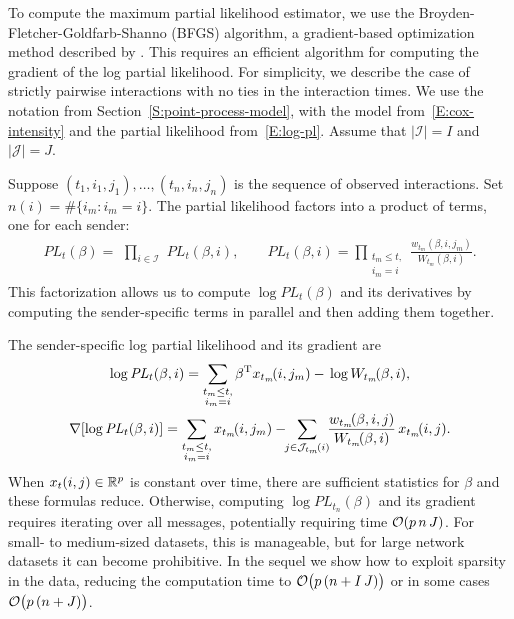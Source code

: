 \documentclass[final]{statsoc}
\begin{document}
To compute the maximum partial likelihood estimator, we use the
Broyden-Fletcher-Goldfarb-Shanno (BFGS) algorithm, a gradient-based
optimization method described by
\citet{nocedal2006numerical}.  This requires an efficient algorithm for
computing the gradient of the log partial likelihood.  For simplicity, we
describe the case of strictly pairwise interactions with no ties in the
interaction times.  We use the notation from
Section~\ref{S:point-process-model}, with
the model from~\eqref{E:cox-intensity} and the partial likelihood 
from~\eqref{E:log-pl}.
Assume that $|\mathcal{I}| = I$ and $|\mathcal{J}| = J$.

Suppose $(t_1, i_1, j_1), \ldots, (t_n, i_n, j_n)$ is the sequence of observed
interactions.  Set $n(i) = \#\{ i_m : i_m = i \}.$
The partial likelihood factors into a product of terms, one for each sender:
\begin{align*}
    \mathit{PL}_t(\beta)
        =
        \,\,
        \prod_{i \in \mathcal{I}}
            \,\,
            \mathit{PL}_t(\beta, i),
    \qquad
    \mathit{PL}_t(\beta, i)
        =
        \!\!\!\!
        \prod_{\substack{t_m \leq t, \\ i_m = i}}
            \!\!\!
            \frac{w_{t_m} (\beta, i, j_m)}
                 {W_{t_m}(\beta, i)}.
\end{align*}
This factorization allows us to compute $\log \mathit{PL}_t(\beta)$ and
its derivatives by computing the sender-specific terms in parallel and
then adding them together.

The sender-specific log partial likelihood and its gradient are
\begin{gather*}
    \log \mathit{PL}_t(\beta, i)
        =
        \sum_{\substack{t_m \leq t, \\ i_m = i}}
            \beta^\trans
            x_{t_m}\!(i, j_m)
            -
            \,
            \log W_{t_m}\!(\beta, i), \\
    \nabla [ \log \mathit{PL}_t(\beta, i) ]
        =
        \sum_{\substack{t_m \leq t, \\ i_m = i}}
            x_{t_m}\!(i,j_m)
            -\!\!
            \sum_{j \in \mathcal{J}_{t_m}\!(i)}\!\!
                \frac{w_{t_m}\!(\beta,i,j)}{W_{t_m}\!(\beta,i)}
                \,
                x_{t_m}\!(i,j).
\end{gather*}
When $x_t(i,j) \in \mathbb{R}^p$ is constant over time,
there are sufficient statistics for $\beta$ and these formulas reduce.
Otherwise, computing $\log \mathit{PL}_{t_n}(\beta)$ and its gradient
requires iterating over all messages, potentially requiring time
$\mathcal{O}(p \, n \, J)$.  For small- to medium-sized datasets, this is manageable,
but for large network datasets it can become
prohibitive.  In the sequel we show how to exploit sparsity
in the data, reducing the computation time to
$\mathcal{O}\big(p \, (n + I \, J)\big)$ or in some cases
$\mathcal{O}\big(p \, (n + J)\big)$.
\end{document}
